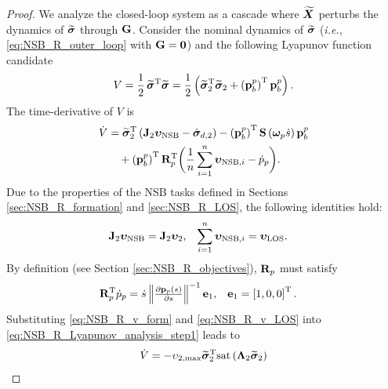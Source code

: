 \begin{proof}
    We analyze the closed-loop system as a cascade where $\widetilde{\bm{X}}$ perturbs the dynamics of $\widetilde{\bm{\sigma}}$ through $\mathbf{G}$.
    Consider the nominal dynamics of $\widetilde{\bm{\sigma}}$ (\emph{i.e.}, \eqref{eq:NSB_R_outer_loop} with $\mathbf{G} = \mathbf{0}$) and the following Lyapunov function candidate 
    \begin{equation}
        V = \frac{1}{2}\,\widetilde{\bm{\sigma}}^{\mathrm{T}}\widetilde{\bm{\sigma}} = \frac{1}{2}\left(\widetilde{\bm{\sigma}}_2^{\mathrm{T}}\widetilde{\bm{\sigma}}_2 + \left(\mathbf{p}_b^p\right)^{\mathrm{T}}\mathbf{p}_b^p\right).
    \end{equation}
    The time-derivative of $V$ is 
    \begin{equation}
        \begin{split}
            \dot{V} &= \widetilde{\bm{\sigma}}_2^{\mathrm{T}}\left(\mathbf{J}_2\bm{\upsilon}_{\rm NSB} - \dot{\bm{\sigma}}_{d, 2}\right)
            - \left(\mathbf{p}_b^p\right)^{\mathrm{T}}\mathbf{S}\left(\bm{\omega}_p\dot{s}\right)\mathbf{p}_b^p \\ 
            &\quad + \left(\mathbf{p}_b^p\right)^{\mathrm{T}}\mathbf{R}_p^{\mathrm{T}}\bigg(\frac{1}{n}\sum_{i=1}^n\bm{\upsilon}_{{\rm NSB}, i} - \dot{p}_p\bigg) .
        \end{split} 
        \label{eq:NSB_R_Lyapunov_analysis_step1}
    \end{equation}
    Due to the properties of the NSB tasks defined in Sections \ref{sec:NSB_R_formation} and \ref{sec:NSB_R_LOS}, the following identities hold: 
    \begin{align}
        \mathbf{J}_2\bm{\upsilon}_{\rm NSB} &= \mathbf{J}_2\bm{\upsilon}_2, &
        \sum_{i=1}^n \bm{\upsilon}_{{\rm NSB}, i} &= \bm{\upsilon}_{\rm LOS}.
    \end{align}
    By definition (see Section \ref{sec:NSB_R_objectives}), $\mathbf{R}_p$ must satisfy 
    \begin{align}
        \mat{R}_p\T\dot{p}_p &= \dot{s}\norm{\scale[1]{\frac{\partial \mat{p}_p(s)}{\partial s}}}^{-1}\mat{e}_1, &
        \mat{e}_1 &= \inlinevector{1, 0, 0}.
    \end{align}
    Substituting \eqref{eq:NSB_R_v_form} and \eqref{eq:NSB_R_v_LOS} into \eqref{eq:NSB_R_Lyapunov_analysis_step1} leads to 
    \begin{equation}
        \begin{split}
        \dot{V} &= -\upsilon_{2, \rm max} \widetilde{\bs{\sigma}}_2\T {\rm sat}\left(\bs{\Lambda}_2\widetilde{\bs{\sigma}}_2\right) \\

\end{split}
\end{equation}
\end{proof}
